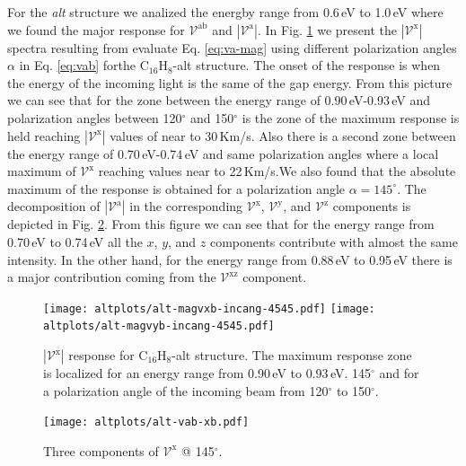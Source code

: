 \documentclass[twocolumn]{article}
\let\Oldsubsubsection\subsubsection
\renewcommand{\subsubsection}{\FloatBarrier\Oldsubsubsection}
\begin{document}
For the \emph{alt} structure we analized the energby range from 0.6\,eV to
1.0\,eV where we found the major response for $\mathcal{V}^{\mathrm{ab}}$ and
$|\mathcal{V}^{\mathrm{a}}|$. In Fig. \ref{fig:alt-magvxbincang} we present the
$|\mathcal{V}^{\mathrm{x}}|$ spectra resulting from evaluate Eq.
\eqref{eq:va-mag} using different polarization angles $\alpha$ in Eq.
\eqref{eq:vab} forthe C$_{16}$H$_{8}$-alt structure. The onset of the response
is when the energy of the incoming light is the same of the gap energy. From
this picture we can see that for the zone between the energy range of
0.90\,eV-0.93\,eV and polarization angles between 120$^{\circ}$ and
150$^{\circ}$ is the zone of the maximum response is held reaching
$|\mathcal{V}^{\mathrm{x}}|$ values of near to 30\,Km/s. Also there is a second
zone between the energy range of 0.70\,eV-0.74\,eV and same polarization angles
where a local maximum of $\mathcal{V}^{\mathrm{x}}$ reaching values near to
22\,Km/s.We also found that the absolute maximum of the response is obtained for
a polarization angle $\alpha = 145^{\circ}$. The decomposition of
$|\mathcal{V}^{\mathrm{a}}|$ in the corresponding $\mathcal{V}^{\mathrm{x}}$,
$\mathcal{V}^{\mathrm{y}}$, and $\mathcal{V}^{\mathrm{z}}$ components is
depicted in Fig. \ref{fig:alt-vxb}. From this figure we can see that for the
energy range from 0.70\,eV to 0.74\,eV all the $x$, $y$, and $z$ components
contribute with almost the same intensity. In the other hand, for the energy
range from 0.88\,eV to 0.95\,eV there is a major contribution coming from the
$\mathcal{V}^{\mathrm{xz}}$ component.

\begin{figure}[tb]
    \centering
    \texttt{[image: altplots/alt-magvxb-incang-4545.pdf]}
    \texttt{[image: altplots/alt-magvyb-incang-4545.pdf]}  
    \caption{$|\mathcal{V}^{\mathrm{x}}|$ response for C$_{16}$H$_{8}$-alt structure. The
    maximum response zone is localized for an energy range from 0.90\,eV to
    0.93\,eV. 145$^{\circ}$ and for a polarization angle of the incoming beam from 120$^{\circ}$ to 150$^{\circ}$.}
    \label{fig:alt-magvxbincang}
\end{figure}
\begin{figure}[tb]
    \centering
    \texttt{[image: altplots/alt-vab-xb.pdf]}
    \caption{Three components of $\mathcal{V}^{\mathrm{x}} $ @ 145$^{\circ}$.}
    \label{fig:alt-vxb}
\end{figure}
\end{document}
